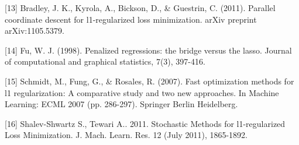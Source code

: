 \documentclass{article} %
\begin{document}
{[13] Bradley, J. K., Kyrola, A., Bickson, D., \& Guestrin, C. (2011). Parallel coordinate descent for l1-regularized loss minimization. arXiv preprint arXiv:1105.5379.

[14] Fu, W. J. (1998). Penalized regressions: the bridge versus the lasso. Journal of computational and graphical statistics, 7(3), 397-416.

[15] Schmidt, M., Fung, G., \& Rosales, R. (2007). Fast optimization methods for l1 regularization: A comparative study and two new approaches. In Machine Learning: ECML 2007 (pp. 286-297). Springer Berlin Heidelberg.

[16] Shalev-Shwartz S., Tewari A.. 2011. Stochastic Methods for l1-regularized Loss Minimization. J. Mach. Learn. Res. 12 (July 2011), 1865-1892.
}
\end{document}
